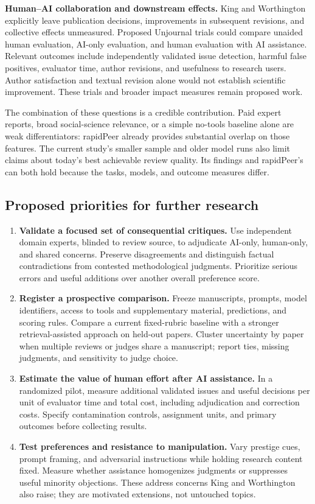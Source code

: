 \documentclass[
  11pt,
  letterpaper,
]{article}
\providecommand{\tightlist}{%
  \setlength{\itemsep}{0pt}\setlength{\parskip}{0pt}}
\begin{document}
\textbf{Human--AI collaboration and downstream effects.} King and
Worthington explicitly leave publication decisions, improvements in
subsequent revisions, and collective effects unmeasured. Proposed
Unjournal trials could compare unaided human evaluation, AI-only
evaluation, and human evaluation with AI assistance. Relevant outcomes
include independently validated issue detection, harmful false
positives, evaluator time, author revisions, and usefulness to research
users. Author satisfaction and textual revision alone would not
establish scientific improvement. These trials and broader impact
measures remain proposed work.

The combination of these questions is a credible contribution. Paid
expert reports, broad social-science relevance, or a simple no-tools
baseline alone are weak differentiators: rapidPeer already provides
substantial overlap on those features. The current study's smaller
sample and older model runs also limit claims about today's best
achievable review quality. Its findings and rapidPeer's can both hold
because the tasks, models, and outcome measures differ.

\subsection{Proposed priorities for further
research}\label{proposed-priorities-for-further-research}

\begin{enumerate}
\def\labelenumi{\arabic{enumi}.}
\tightlist
\item
  \textbf{Validate a focused set of consequential critiques.} Use
  independent domain experts, blinded to review source, to adjudicate
  AI-only, human-only, and shared concerns. Preserve disagreements and
  distinguish factual contradictions from contested methodological
  judgments. Prioritize serious errors and useful additions over another
  overall preference score.
\item
  \textbf{Register a prospective comparison.} Freeze manuscripts,
  prompts, model identifiers, access to tools and supplementary
  material, predictions, and scoring rules. Compare a current
  fixed-rubric baseline with a stronger retrieval-assisted approach on
  held-out papers. Cluster uncertainty by paper when multiple reviews or
  judges share a manuscript; report ties, missing judgments, and
  sensitivity to judge choice.
\item
  \textbf{Estimate the value of human effort after AI assistance.} In a
  randomized pilot, measure additional validated issues and useful
  decisions per unit of evaluator time and total cost, including
  adjudication and correction costs. Specify contamination controls,
  assignment units, and primary outcomes before collecting results.
\item
  \textbf{Test preferences and resistance to manipulation.} Vary
  prestige cues, prompt framing, and adversarial instructions while
  holding research content fixed. Measure whether assistance homogenizes
  judgments or suppresses useful minority objections. These address
  concerns King and Worthington also raise; they are motivated
  extensions, not untouched topics.
\end{enumerate}
\end{document}
